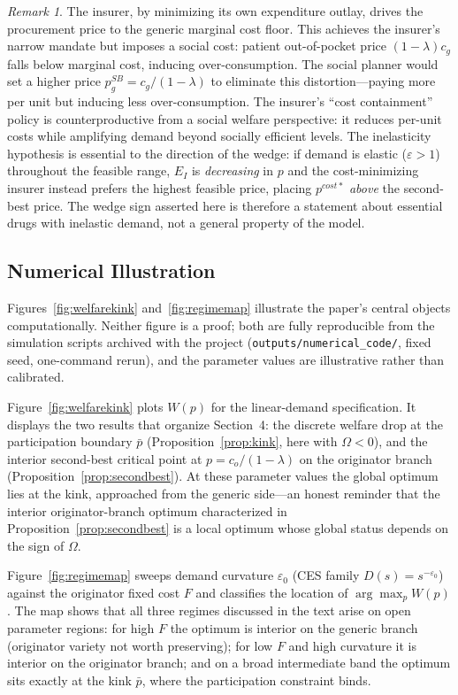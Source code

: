 \documentclass[12pt]{article}
\theoremstyle{plain}
\theoremstyle{definition}
\theoremstyle{remark}
\newtheorem{remark}{Remark}
\newcommand{\pbar}{\bar{p}}
\newcommand{\EI}{E_{I}}
\newcommand{\Pcost}{p^{cost*}}
\newcommand{\1}{\mathbf{1}}
\begin{document}
\begin{remark}
The insurer, by minimizing its own expenditure outlay, drives the procurement price to the generic marginal cost floor. This achieves the insurer's narrow mandate but imposes a social cost: patient out-of-pocket price $(1-\lambda)c_g$ falls below marginal cost, inducing over-consumption. The social planner would set a higher price $p^{SB}_g = c_g/(1-\lambda)$ to eliminate this distortion---paying more per unit but inducing less over-consumption. The insurer's ``cost containment'' policy is counterproductive from a social welfare perspective: it reduces per-unit costs while amplifying demand beyond socially efficient levels. The inelasticity hypothesis is essential to the direction of the wedge: if demand is elastic ($\varepsilon > 1$) throughout the feasible range, $\EI$ is \emph{decreasing} in $p$ and the cost-minimizing insurer instead prefers the highest feasible price, placing $\Pcost$ \emph{above} the second-best price. The wedge sign asserted here is therefore a statement about essential drugs with inelastic demand, not a general property of the model.
\end{remark}

\subsection{Numerical Illustration}
\label{sec:numerical}

Figures~\ref{fig:welfarekink} and~\ref{fig:regimemap} illustrate the paper's central objects computationally. Neither figure is a proof; both are fully reproducible from the simulation scripts archived with the project (\texttt{outputs/numerical\_code/}, fixed seed, one-command rerun), and the parameter values are illustrative rather than calibrated.

Figure~\ref{fig:welfarekink} plots $W(p)$ for the linear-demand specification. It displays the two results that organize Section~4: the discrete welfare drop at the participation boundary $\pbar$ (Proposition~\ref{prop:kink}, here with $\Omega < 0$), and the interior second-best critical point at $p = c_o/(1-\lambda)$ on the originator branch (Proposition~\ref{prop:secondbest}). At these parameter values the global optimum lies at the kink, approached from the generic side---an honest reminder that the interior originator-branch optimum characterized in Proposition~\ref{prop:secondbest} is a local optimum whose global status depends on the sign of $\Omega$.

Figure~\ref{fig:regimemap} sweeps demand curvature $\varepsilon_0$ (CES family $D(s) = s^{-\varepsilon_0}$) against the originator fixed cost $F$ and classifies the location of $\arg\max_p W(p)$. The map shows that all three regimes discussed in the text arise on open parameter regions: for high $F$ the optimum is interior on the generic branch (originator variety not worth preserving); for low $F$ and high curvature it is interior on the originator branch; and on a broad intermediate band the optimum sits exactly at the kink $\pbar$, where the participation constraint binds.
\end{document}
